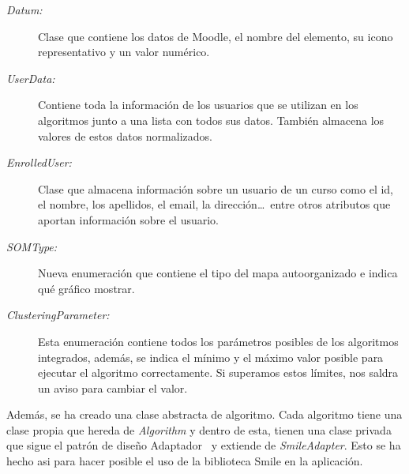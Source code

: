 \begin{description}
    
    \item[\emph{Datum\footnotemark[1]:}] Clase que contiene los datos de Moodle, el nombre del elemento, su icono representativo y un valor numérico.
    
    \item[\emph{UserData\footnotemark[1]:}] Contiene toda la información de los usuarios que se utilizan en los algoritmos junto a una lista con todos sus datos. También almacena los valores de estos datos normalizados.
    
    \item[\emph{EnrolledUser\footnotemark[1]:}] Clase que almacena información sobre un usuario de un curso como el id, el nombre, los apellidos, el email, la dirección\dots~entre otros atributos que aportan información sobre el usuario.



    \item[\emph{SOMType:}] Nueva enumeración que contiene el tipo del mapa autoorganizado e indica qué gráfico mostrar.

    
    \item[\emph{ClusteringParameter:}] Esta enumeración contiene todos los parámetros posibles de los algoritmos integrados, además, se indica el mínimo y el máximo valor posible para ejecutar el algoritmo correctamente. Si superamos estos límites, nos saldra un aviso para cambiar el valor.
    

\end{description}

Además, se ha creado una clase abstracta de algoritmo. Cada algoritmo tiene una clase propia que hereda de \emph{Algorithm} y dentro de esta, tienen una clase privada que sigue el patrón de diseño Adaptador~\cite{libro:patrones} y extiende de \emph{SmileAdapter}. Esto se ha hecho asi para hacer posible el uso de la biblioteca Smile en la aplicación.


